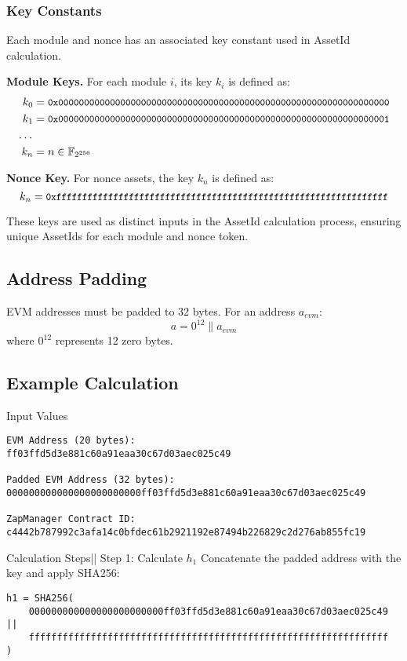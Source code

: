 \subsubsection{Key Constants}
Each module and nonce has an associated key constant used in AssetId calculation.

\textbf{Module Keys.} For each module $i$, its key $k_i$ is defined as:
\begin{align*}
k_0 &= \small{\texttt{0x0000000000000000000000000000000000000000000000000000000000000000}} \\
k_1 &= \small{\texttt{0x0000000000000000000000000000000000000000000000000000000000000001}} \\
\small{\texttt{...}} \\
k_n &= n \in \mathbb{F}_{2^{256}}
\end{align*}

\textbf{Nonce Key.} For nonce assets, the key $k_n$ is defined as:
\[ k_n = \small{\texttt{0xffffffffffffffffffffffffffffffffffffffffffffffffffffffffffffffff}} \]

These keys are used as distinct inputs in the AssetId calculation process, ensuring unique AssetIds for each module and nonce token.



\subsection{Address Padding}
EVM addresses must be padded to 32 bytes. For an address $a_{evm}$:
\[ a = 0^{12} \parallel a_{evm} \]
where $0^{12}$ represents 12 zero bytes.


\subsection{Example Calculation}
Input Values
\begin{Verbatim}
EVM Address (20 bytes):
ff03ffd5d3e881c60a91eaa30c67d03aec025c49

Padded EVM Address (32 bytes):
000000000000000000000000ff03ffd5d3e881c60a91eaa30c67d03aec025c49

ZapManager Contract ID:
c4442b787992c3afa14c0bfdec61b2921192e87494b226829c2d276ab855fc19
\end{Verbatim}

Calculation Steps||
Step 1: Calculate $h_1$
Concatenate the padded address with the key and apply SHA256:
\begin{Verbatim}
h1 = SHA256(
    000000000000000000000000ff03ffd5d3e881c60a91eaa30c67d03aec025c49 ||
    ffffffffffffffffffffffffffffffffffffffffffffffffffffffffffffffff
)
\end{Verbatim}

